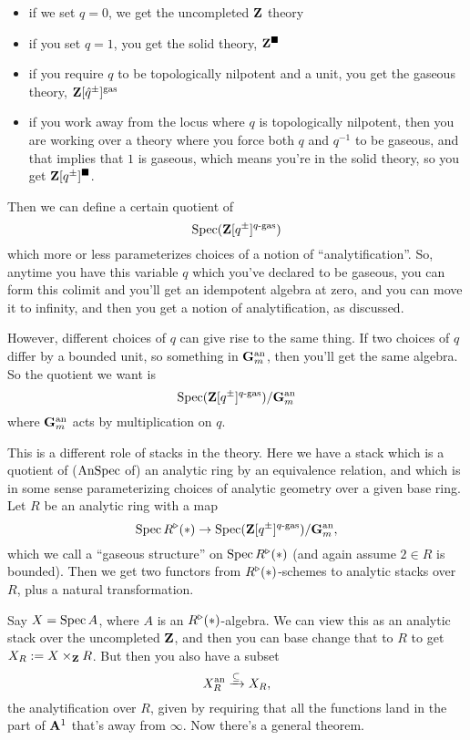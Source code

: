 \begin{itemize}
  \item if we set $q=0$, we get the uncompleted $\mathbf Z$ theory
  \item if you set $q=1$, you get the solid theory, $\mathbf Z^\blacksquare$
  \item if you require $q$ to be topologically nilpotent and a unit, you get the gaseous theory, $\mathbf Z[\hat q^\pm]^{\mathrm{gas}}$
  \item if you work away from the locus where $q$ is topologically nilpotent, then you are working over a theory where you force both $q$ and $q^{-1}$ to be gaseous, and that implies that $1$ is gaseous, which means you're in the solid theory, so you get $\mathbf Z[q^\pm]^\blacksquare$.
\end{itemize}

Then we can define a certain quotient of
\[ \operatorname{Spec}(\mathbf Z[q^\pm]^{\text{$q$-gas}}) \]
which more or less parameterizes choices of a notion of ``analytification''. So, anytime you have this variable $q$ which you've declared to be gaseous, you can form this colimit and you'll get an idempotent algebra at zero, and you can move it to infinity, and then you get a notion of analytification, as discussed.

However, different choices of $q$ can give rise to the same thing. If two choices of $q$ differ by a bounded unit, so something in $\mathbf G_m^{\mathrm{an}}$, then you'll get the same algebra. So the quotient we want is 
\[ \operatorname{Spec}(\mathbf Z[q^\pm]^{\text{$q$-gas}})/\mathbf G_m^{\mathrm{an}} \]
where $\mathbf G_m^{\mathrm{an}}$ acts by multiplication on $q$.

This is a different role of stacks in the theory. Here we have a stack which is a quotient of ($\operatorname{AnSpec}$ of) an analytic ring by an equivalence relation, and which is in some sense parameterizing choices of analytic geometry over a given base ring. Let $R$ be an analytic ring with a map
\[ \operatorname{Spec} R^\triangleright(*) \to \operatorname{Spec}(\mathbf Z[q^\pm]^{\text{$q$-gas}})/\mathbf G_m^{\mathrm{an}}, \]
which we call a ``gaseous structure'' on $\operatorname{Spec} R^\triangleright(*)$ (and again assume $2\in R$ is bounded). Then we get two functors from $R^\triangleright(*)$-schemes to analytic stacks over $R$, plus a natural transformation.

Say $X=\operatorname{Spec} A$, where $A$ is an $R^\triangleright(*)$-algebra. We can view this as an analytic stack over the uncompleted $\mathbf Z$, and then you can base change that to $R$ to get $X_R\mathrel{:=} X\times_\mathbf Z R$. But then you also have a subset
\[ X^{\mathrm{an}}_R \xrightarrow\subseteq X_R, \]
the analytification over $R$, given by requiring that all the functions land in the part of $\mathbf A^1$ that's away from $\infty$. Now there's a general theorem.

